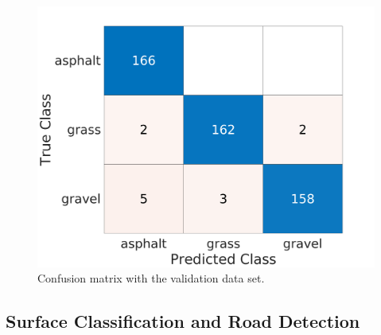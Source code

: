\documentclass[journal,onecolumn]{IEEEtran}
\begin{document}
			\begin{figure}[H]
				\centering
				\includegraphics[width=0.75\linewidth]{figures/chan_2c_conf_VALIDATION_mat222}
				\caption[Validation Error]{Confusion matrix with the validation data set.}
				\label{fig:vali_err_conf_mat}
			\end{figure}

		\subsection{Surface Classification and Road Detection}	

\end{document}
